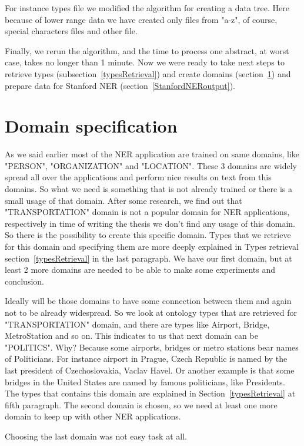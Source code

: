 \documentclass[thesis=M,english]{FITthesis}[2018/05/30]
\begin{document}
	For instance types file we modified the algorithm for creating a data tree. Here because of lower range data we have created only files from "a-z", of course, special characters files and other file.

	Finally, we rerun the algorithm, and the time to process one abstract, at worst case, takes no longer than 1 minute. Now we were ready to take next steps to retrieve types (subsection~\ref{typesRetrieval}) and create domains (section~\ref{domainSpecification}) and prepare data for Stanford NER (section~\ref{StanfordNERoutput}).

\section{Domain specification}\label{domainSpecification}
	As we said earlier most of the NER application are trained on same domains, like "PERSON", "ORGANIZATION" and "LOCATION". These 3 domains are widely spread all over the applications and perform nice results on text from this domains. So what we need is something that is not already trained or there is a small usage of that domain. After some research, we find out that "TRANSPORTATION" domain is not a popular domain for NER applications, respectively in time of writing the thesis we don't find any usage of this domain. So there is the possibility to create this specific domain. Types that we retrieve for this domain and specifying them are more deeply explained in Types retrieval section~\ref{typesRetrieval} in the last paragraph. We have our first domain, but at least 2 more domains are needed to be able to make some experiments and conclusion. 

	Ideally will be those domains to have some connection between them and again not to be already widespread. So we look at ontology types that are retrieved for "TRANSPORTATION" domain, and there are types like Airport, Bridge, MetroStation and so on. This indicates to us that next domain can be "POLITICS". Why? Because some airports, bridges or metro stations bear names of Politicians. For instance airport in Prague, Czech Republic is named by the last president of Czechoslovakia, Vaclav Havel. Or another example is that some bridges in the United States are named by famous politicians, like Presidents. The types that contains this domain are explained in Section~\ref{typesRetrieval} at fifth paragraph. The second domain is chosen, so we need at least one more domain to keep up with other NER applications. 
	
	Choosing the last domain was not easy task at all. 
	
\end{document}
